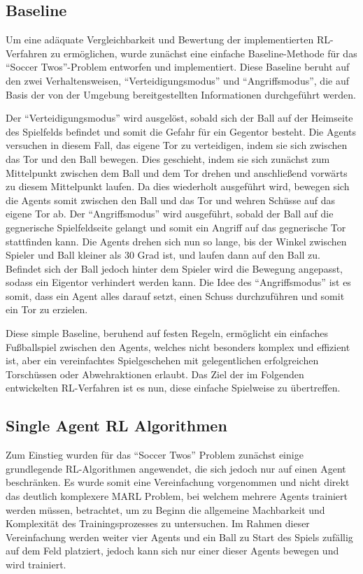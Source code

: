 \documentclass[twocolumn]{webofc}
\begin{document}
\subsection{Baseline}

Um eine adäquate Vergleichbarkeit und Bewertung der implementierten \ac{RL}-Verfahren zu ermöglichen, wurde zunächst eine einfache Baseline-Methode für das \enquote{Soccer Twos}-Problem entworfen und implementiert. Diese Baseline beruht auf den zwei Verhaltensweisen, \enquote{Verteidigungsmodus} und \enquote{Angriffsmodus}, die auf Basis der von der Umgebung bereitgestellten Informationen durchgeführt werden.

Der \enquote{Verteidigungsmodus} wird ausgelöst, sobald sich der Ball auf der Heimseite des Spielfelds befindet und somit die Gefahr für ein Gegentor besteht. Die Agents versuchen in diesem Fall, das eigene Tor zu verteidigen, indem sie sich zwischen das Tor und den Ball bewegen. Dies geschieht, indem sie sich zunächst zum Mittelpunkt zwischen dem Ball und dem Tor drehen und anschließend vorwärts zu diesem Mittelpunkt laufen. Da dies wiederholt ausgeführt wird, bewegen sich die Agents somit zwischen den Ball und das Tor und wehren Schüsse auf das eigene Tor ab.
Der \enquote{Angriffsmodus} wird ausgeführt, sobald der Ball auf die gegnerische Spielfeldseite gelangt und somit ein Angriff auf das gegnerische Tor stattfinden kann. Die Agents drehen sich nun so lange, bis der Winkel zwischen Spieler und Ball kleiner als 30 Grad ist, und laufen dann auf den Ball zu. Befindet sich der Ball jedoch hinter dem Spieler wird die Bewegung angepasst, sodass ein Eigentor verhindert werden kann. Die Idee des \enquote{Angriffsmodus} ist es somit, dass ein Agent alles darauf setzt, einen Schuss durchzuführen und somit ein Tor zu erzielen.

Diese simple Baseline, beruhend auf festen Regeln, ermöglicht ein einfaches Fußballspiel zwischen den Agents, welches nicht besonders komplex und effizient ist, aber ein vereinfachtes Spielgeschehen mit gelegentlichen erfolgreichen Torschüssen oder Abwehraktionen erlaubt. Das Ziel der im Folgenden entwickelten \ac{RL}-Verfahren ist es nun, diese einfache Spielweise zu übertreffen.


\subsection{Single Agent RL Algorithmen}

Zum Einstieg wurden für das \enquote{Soccer Twos} Problem zunächst einige grundlegende \ac{RL}-Algorithmen angewendet, die sich jedoch nur auf einen Agent beschränken. Es wurde somit eine Vereinfachung vorgenommen und nicht direkt das deutlich komplexere \ac{MARL} Problem, bei welchem mehrere Agents trainiert werden müssen, betrachtet, um zu Beginn die allgemeine Machbarkeit und Komplexität des Trainingsprozesses zu untersuchen. Im Rahmen dieser Vereinfachung werden weiter vier Agents und ein Ball zu Start des Spiels zufällig auf dem Feld platziert, jedoch kann sich nur einer dieser Agents bewegen und wird trainiert. 
\end{document}
